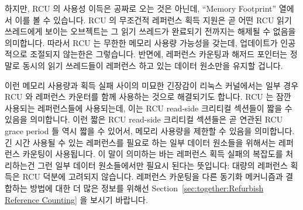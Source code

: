 하지만, RCU 의 사용성 이득은 공짜로 오는 것은 아닌데, ``Memory Footprint''
열에서 이를 볼 수 있습니다.
RCU 의 무조건적 레퍼런스 획득 지원은 곧 어떤 RCU 읽기 쓰레드에게 보이는
오브젝트는 그 읽기 쓰레드가 완료되기 전까지는 해제될 수 없음을 의미합니다.
따라서 RCU 는 무한한 메모리 사용량 가능성을 갖는데, 업데이트가 인공적으로
조절되지 않는한은 그렇습니다.
반면에, 레퍼런스 카운팅과 해저드 포인터는 정말로 동시의 읽기 쓰레드들이
레퍼런스 하고 있는 데이터 원소만을 유지할 겁니다.
\iffalse

However, RCU's ease-of-use advantage does not come
for free, as can be seen in the ``Memory Footprint'' row.
RCU's support of unconditional reference acquisition means that
it must avoid freeing any object reachable by a given
RCU reader until that reader completes.
RCU therefore has an unbounded memory footprint, at least unless updates
are throttled.
In contrast, reference counting and hazard pointers need to  retain only
those data elements actually referenced by concurrent readers.
\fi

이런 메모리 사용량과 획득 실패 사이의 미묘한 긴장감이 리눅스 커널에서는 일부
경우 RCU 와 레퍼런스 카운터를 함께 사용하는 것으로 해결되기도 합니다.
RCU 는 잠깐 사용되는 레퍼런스들에 사용되는데, 이는 RCU read-side 크리티컬
섹션들이 짧을 수 있음을 의미합니다.
이런 짧은 RCU read-side 크리티컬 섹션들은 곧 연관된 RCU grace period 들 역시
짧을 수 있어서, 메모리 사용량을 제한할 수 있음을 의미합니다.
긴 시간 사용될 수 있는 레퍼런스를 필요로 하는 일부 데이터 원소들을 위해서는
레퍼런스 카운팅이 사용됩니다.
이 말이 의미하는 바는 레퍼런스 획득 실패의 복잡도를 처리하는건 그런 일부 데이터
원소들에서만 필요시 된다는 뜻입니다:  대량의 레퍼런스 획득은 RCU 덕분에
고려되지 않습니다.
레퍼런스 카운팅을 다른 동기화 메커니즘과 결합하는 방법에 대한 더 많은 정보를
위해선
Section~\ref{sec:together:Refurbish Reference Counting} 을 보시기 바랍니다.
\iffalse

This tension between memory footprint and acquisition
failures is sometimes resolved within the Linux kernel by combining use
of RCU and reference counters.
RCU is used for short-lived references, which means that RCU read-side
critical sections can be short.
These short RCU read-side critical sections in turn mean that the corresponding
RCU grace periods can also be short, which limits the memory footprint.
For the few data elements that need longer-lived references, reference
counting is used.
This means that the complexity of reference-acquisition failure only
needs to be dealt with for those few data elements:  The bulk of
the reference acquisitions are unconditional, courtesy of RCU.
See Section~\ref{sec:together:Refurbish Reference Counting}
for more information on combining reference counting with other
synchronization mechanisms.
\fi

